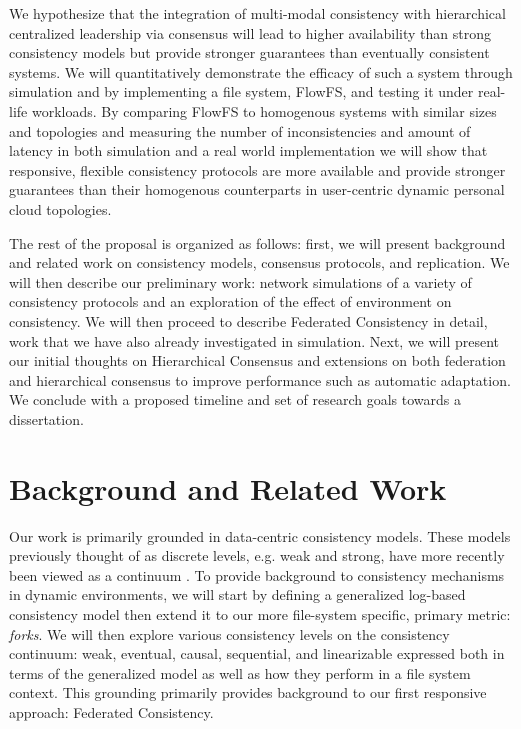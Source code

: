 \documentclass{article}
\begin{document}
We hypothesize that the integration of multi-modal consistency with hierarchical centralized leadership via consensus will lead to higher availability than strong consistency models but provide stronger guarantees than eventually consistent systems. We will quantitatively demonstrate the efficacy of such a system through simulation and by implementing a file system, FlowFS, and testing it under real-life workloads. By comparing FlowFS to homogenous systems with similar sizes and topologies and measuring the number of inconsistencies and amount of latency in both simulation and a real world implementation we will show that responsive, flexible consistency protocols are more available and provide stronger guarantees than their homogenous counterparts in user-centric dynamic personal cloud topologies.

The rest of the proposal is organized as follows: first, we will present background and related work on consistency models, consensus protocols, and replication. We will then describe our preliminary work: network simulations of a variety of consistency protocols and an exploration of the effect of environment on consistency. We will then proceed to describe Federated Consistency in detail, work that we have also already investigated in simulation. Next, we will present our initial thoughts on Hierarchical Consensus and extensions on both federation and hierarchical consensus to improve performance such as automatic adaptation. We conclude with a proposed timeline and set of research goals towards a dissertation.

\section{Background and Related Work}
\label{sec:background}

Our work is primarily grounded in data-centric consistency models. These models previously thought of as discrete levels, e.g. weak and strong, have more recently been viewed as a continuum \cite{yu_design_2002,afek_quasi-linearizability:_2010}. To provide background to consistency mechanisms in dynamic environments, we will start by defining a generalized log-based consistency model then extend it to our more file-system specific, primary metric: \textit{forks}. We will then explore various consistency levels on the consistency continuum: weak, eventual, causal, sequential, and linearizable expressed both in terms of the generalized model as well as how they perform in a file system context. This grounding primarily provides background to our first responsive approach: Federated Consistency.
\end{document}
